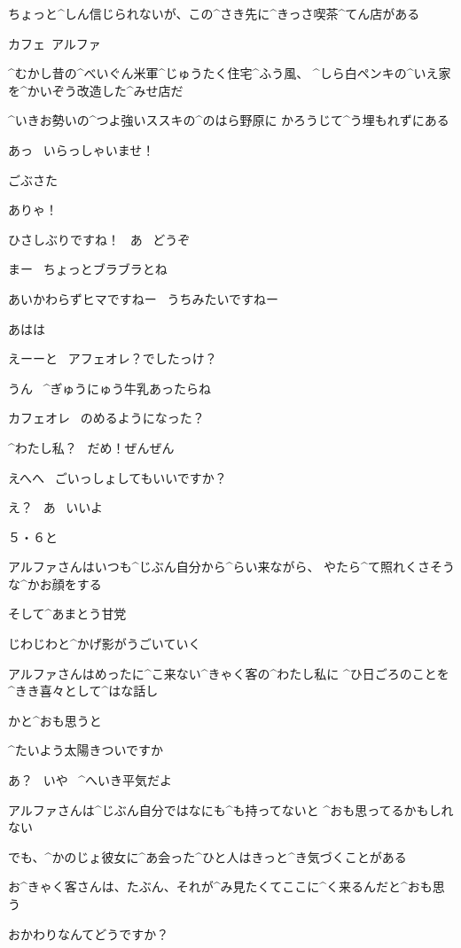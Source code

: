 \page
\N ちょっと^{しん}{信}じられないが、この^{さき}{先}に^{きっさ}{喫茶}^{てん}{店}がある

\N カフェ\ アルファ

\N ^{むかし}{昔}の^{べいぐん}{米軍}^{じゅうたく}{住宅}^{ふう}{風}、
^{しら}{白}ペンキの^{いえ}{家}を^{かいぞう}{改造}した^{みせ}{店}だ

\page
\N ^{いきお}{勢}いの^{つよ}{強}いススキの^{のはら}{野原}に
かろうじて^{う}{埋}もれずにある

\page
\A あっ
\ いらっしゃいませ！

\N ごぶさた

\page
\A ありゃ！

\A ひさしぶりですね！
\ あ
\ どうぞ

\N まー
\ ちょっとブラブラとね

\A あいかわらずヒマですねー
\ うちみたいですねー

\A あはは

\page
\A えーーと
\ アフェオレ？でしたっけ？

\A うん
\ ^{ぎゅうにゅう}{牛乳}あったらね

\N カフェオレ
\ のめるようになった？

\A ^{わたし}{私}？
\ だめ！ぜんぜん

\page
\A えへへ
\ ごいっしょしてもいいですか？

\N え？
\ あ
\ いいよ

\A ５・６と

\N アルファさんはいつも^{じぶん}{自分}から^{らい}{来}ながら、
やたら^{て}{照}れくさそうな^{かお}{顔}をする

\N そして^{あまとう}{甘党}

\page
\N じわじわと^{かげ}{影}がうごいていく

\N アルファさんはめったに^{こ}{来}ない^{きゃく}{客}の^{わたし}{私}に
^{ひ}{日}ごろのことを^{きき}{喜々}として^{はな}{話}し

\page
\N かと^{おも}{思}うと

\A ^{たいよう}{太陽}きついですか

\N あ？
\ いや
\ ^{へいき}{平気}だよ

\page
\N アルファさんは^{じぶん}{自分}ではなにも^{も}{持}ってないと
^{おも}{思}ってるかもしれない

\N でも、^{かのじょ}{彼女}に^{あ}{会}った^{ひと}{人}はきっと^{き}{気}づくことがある

\N お^{きゃく}{客}さんは、たぶん、それが^{み}{見}たくてここに^{く}{来}るんだと^{おも}{思}う

\page
\A おかわりなんてどうですか？

